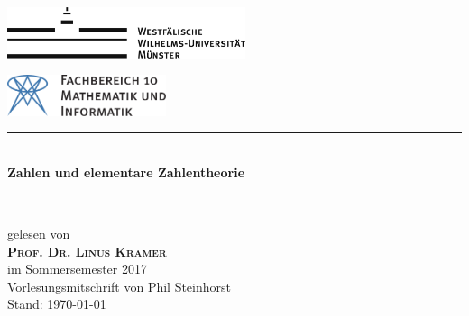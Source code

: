 \begin{titlepage}
	\newcommand{\HRule}{\rule{\linewidth}{0.8mm}} %

	\center %
 
	\begin{minipage}{0.4\textwidth}
	\begin{flushleft}
	\includegraphics[height=1.5cm,keepaspectratio]{../!config/Bilder/wwulogo.pdf}\\[1cm]
	\end{flushleft}
	\end{minipage}
	\hfill
	\begin{minipage}{0.4\textwidth}
	\begin{flushright}
	\vspace*{0.3cm}
	\includegraphics[height=1.2cm,keepaspectratio]{../!config/Bilder/fb10logo.pdf} \
	\end{flushright}
	\end{minipage}

	\vspace{2cm}
	
	\HRule \\[0.8cm]
	{ \huge \sffamily\bfseries Zahlen und elementare Zahlentheorie}\\[0.4cm] %
	\HRule \\[1cm]
 
	{\LARGE gelesen von} \\[.7cm]
	\textsc{\LARGE \textbf{Prof. Dr. Linus Kramer}}\\[.7cm]
	{\LARGE im Sommersemester 2017}\\[2cm]


	\vfill
	{\Large Vorlesungsmitschrift von Phil Steinhorst} \\[.5cm]
	{\large Stand: \today}
	
\end{titlepage}